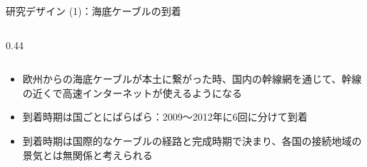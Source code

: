 \documentclass[aspectratio=169,11pt]{beamer}
\begin{document}
\begin{frame}{研究デザイン (1)：海底ケーブルの到着}
\begin{columns}[c]
\begin{column}{0.44\textwidth}
    \end{column}
  \end{columns}
  \vspace{0.6em}
  \begin{itemize}\small
    \item 欧州からの海底ケーブルが本土に繋がった時、国内の幹線網を通じて、幹線の近くで高速インターネットが使えるようになる
    \item 到着時期は国ごとにばらばら：2009〜2012年に6回に分けて到着
    \item 到着時期は国際的なケーブルの経路と完成時期で決まり、\alert{各国の接続地域の景気とは無関係}と考えられる
  \end{itemize}
\end{frame}

\end{document}
